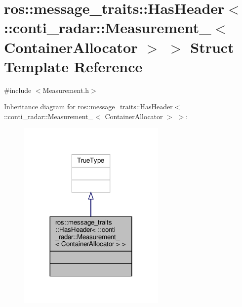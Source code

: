 \hypertarget{structros_1_1message__traits_1_1HasHeader_3_01_1_1conti__radar_1_1Measurement___3_01ContainerAllocator_01_4_01_4}{}\section{ros\+:\+:message\+\_\+traits\+:\+:Has\+Header$<$ \+:\+:conti\+\_\+radar\+:\+:Measurement\+\_\+$<$ Container\+Allocator $>$ $>$ Struct Template Reference}
\label{structros_1_1message__traits_1_1HasHeader_3_01_1_1conti__radar_1_1Measurement___3_01ContainerAllocator_01_4_01_4}


{\ttfamily \#include $<$Measurement.\+h$>$}



Inheritance diagram for ros\+:\+:message\+\_\+traits\+:\+:Has\+Header$<$ \+:\+:conti\+\_\+radar\+:\+:Measurement\+\_\+$<$ Container\+Allocator $>$ $>$\+:\nopagebreak
\begin{figure}[H]
\begin{center}
\leavevmode
\includegraphics[width=204pt]{d3/da2/structros_1_1message__traits_1_1HasHeader_3_01_1_1conti__radar_1_1Measurement___3_01ContainerAllbecf8268ac87b11f5e7ffcb7c59b3b8b}
\end{center}
\end{figure}



